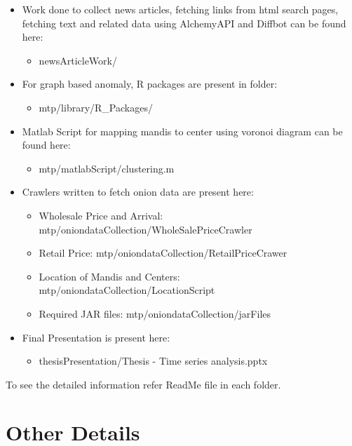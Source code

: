 \documentclass[a4paper,10pt]{article}
\begin{document}
\begin{itemize}
  	
\item Work done to collect news articles, fetching links from html search pages, fetching text and related data using AlchemyAPI and Diffbot can be found here:
	\begin{itemize}
		\item newsArticleWork/
	\end{itemize}

\item For graph based anomaly, R packages are present in folder:
	\begin{itemize}
		\item mtp/library/R\_Packages/
	\end{itemize}
	
	
\item Matlab Script for mapping mandis to center using voronoi diagram can be found here:
	\begin{itemize}
		\item mtp/matlabScript/clustering.m
	\end{itemize}
	
\item Crawlers written to fetch onion data are present here:
	\begin{itemize}
		\item Wholesale Price and Arrival: mtp/oniondataCollection/WholeSalePriceCrawler
		\item Retail Price: mtp/oniondataCollection/RetailPriceCrawer
		\item Location of Mandis and Centers: mtp/oniondataCollection/LocationScript
		\item Required JAR files: mtp/oniondataCollection/jarFiles
	\end{itemize}

\item Final Presentation is present here:
	\begin{itemize}
		\item thesisPresentation/Thesis - Time series analysis.pptx
	\end{itemize}

\end{itemize}

To see the detailed information refer ReadMe file in each folder.

\section{Other Details}
\end{document}

